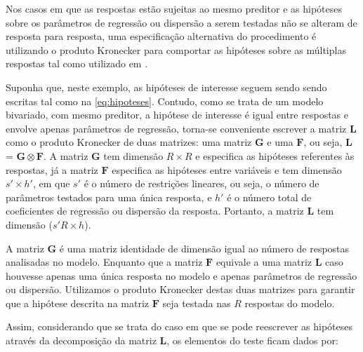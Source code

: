 Nos casos em que as respostas estão sujeitas ao mesmo preditor e as hipóteses sobre os parâmetros de regressão ou dispersão a serem testadas não se alteram de resposta para resposta, uma especificação alternativa do procedimento é utilizando o produto Kronecker para comportar as hipóteses sobre as múltiplas respostas tal como utilizado em \citet{plastica}.

Suponha que, neste exemplo, as hipóteses de interesse seguem sendo sendo escritas tal como na \autoref{eq:hipoteses}. Contudo, como se trata de um modelo bivariado, com mesmo preditor, a hipótese de interesse é igual entre respostas e envolve apenas parâmetros de regressão, torna-se conveniente escrever a matriz $\boldsymbol{L}$ como o produto Kronecker de duas matrizes: uma matriz $\boldsymbol{G}$ e uma $\boldsymbol{F}$, ou seja, $\boldsymbol{L}$ = $\boldsymbol{G} \otimes \boldsymbol{F}$. A matriz $\boldsymbol{G}$ tem dimensão $R \times R$ e especifica as hipóteses referentes às respostas, já a matriz $\boldsymbol{F}$ especifica as hipóteses entre variáveis e tem dimensão ${s}' \times {h}'$, em que ${s}'$ é o número de restrições lineares, ou seja, o número de parâmetros testados para uma única resposta, e ${h}'$ é o número total de coeficientes de regressão ou dispersão da resposta. Portanto, a matriz $\boldsymbol{L}$ tem dimensão (${s}'R \times h$).

A matriz $\boldsymbol{G}$ é uma matriz identidade de dimensão igual ao número de respostas analisadas no modelo. Enquanto que a matriz $\boldsymbol{F}$ equivale a uma matriz $\boldsymbol{L}$ caso houvesse apenas uma única resposta no modelo e apenas parâmetros de regressão ou dispersão. Utilizamos o produto Kronecker destas duas matrizes para garantir que a hipótese descrita na matriz $\boldsymbol{F}$ seja testada nas $R$ respostas do modelo.

Assim, considerando que se trata do caso em que se pode reescrever as hipóteses através da decomposição da matriz $\boldsymbol{L}$, os elementos do teste ficam dados por:

